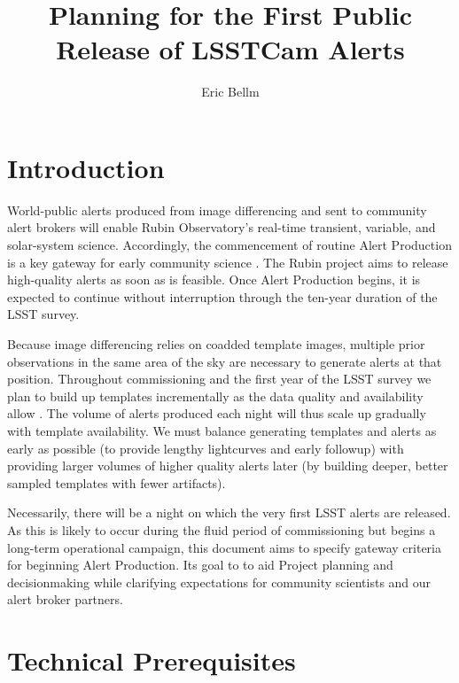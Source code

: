 \documentclass[OPS,authoryear,toc]{lsstdoc}
\title{Planning for the First Public Release of LSSTCam Alerts}
\author{%
Eric Bellm
}
\date{\vcsDate}
\begin{document}
\maketitle

\section{Introduction}

World-public alerts produced from image differencing and sent to community alert brokers will enable Rubin Observatory's real-time transient, variable, and solar-system science.
Accordingly, the commencement of routine Alert Production is a key gateway for early community science .
The Rubin project aims to release high-quality alerts as soon as is feasible.
Once Alert Production begins, it is expected to continue without interruption through the ten-year duration of the LSST survey.

Because image differencing relies on coadded template images, multiple prior observations in the same area of the sky are necessary to generate alerts at that position.
Throughout commissioning and the first year of the LSST survey we plan to build up templates incrementally as the data quality and availability allow .
The volume of alerts produced each night will thus scale up gradually with template availability.
We must balance generating templates and alerts as early as possible (to provide lengthy lightcurves and early followup) with providing larger volumes of higher quality alerts later (by building deeper, better sampled templates with fewer artifacts).

Necessarily, there will be a night on which the very first LSST alerts are released. 
As this is likely to occur during the fluid period of commissioning but begins a long-term operational campaign, this document aims to specify gateway criteria for beginning Alert Production.
Its goal to to aid Project planning and decisionmaking while clarifying expectations for community scientists and our alert broker partners.



\section{Technical Prerequisites}
\end{document}
